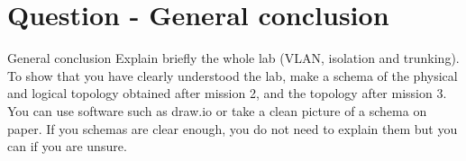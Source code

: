 \section{Question - General conclusion}

\begin{questionBox}{General conclusion}
    Explain briefly the whole lab (VLAN, isolation and trunking). To show that you have clearly understood the lab, make a schema of the physical and logical topology obtained after mission 2, and the topology after mission 3. You can use software such as draw.io or take a clean picture of a schema on paper. If you schemas are clear enough, you do not need to explain them but you can if you are unsure.
\end{questionBox}
